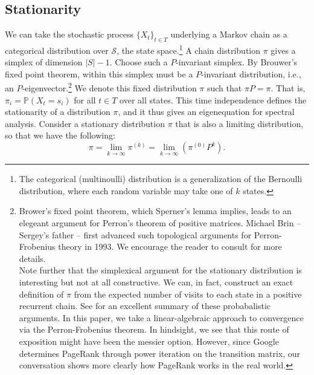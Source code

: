 \documentclass[11pt,letterpaper]{amsart}
\newcommand{\iterate}[2]{#1^{(#2)}}
\newcommand{\parens}[1]{ \left( #1 \right) }
\newcommand{\prob}{\mathbb{P}}
\begin{document}
\subsection{Stationarity}
We can take the stochastic process $\{X_t\}_{t \in T}$ underlying a Markov chain
as a categorical distribution over $\mathcal{S}$, the state space.\footnote{The
  categorical (multinoulli) distribution is a generalization of the Bernoulli
  distribution, where each random variable may take one of $k$ states.} A chain
distribution $\pi$ gives a simplex of dimension $|S| - 1$. Choose such a
$P$-invariant simplex. By Brouwer's fixed point theorem, within this simplex
must be a $P$-invariant distribution, i.e., an
$P$-eigenvector.\footnote{Brower's fixed point theorem, which Sperner's lemma
  implies, leads to an elegeant argument for Perron's theorem of positive
  matrices. Michael Brin -- Sergey's father -- first advanced such topological
  arguments for Perron-Frobenius theory in 1993. We encourage the reader to
  consult \cite{boyleBasicPerronFrobeniusTheory} for more details.
  \vspace{0.5em} \\ Note further that the simplexical argument for the
  stationary distribution is interesting but not at all constructive. We can, in
  fact, construct an exact definition of $\pi$ from the expected number of
  visits to each state in a positive recurrent chain. See
  \cite{freedmanConvergenceTheoremFinite} for an excellent summary of these
  probabalistic arguments. In this paper, we take a linear-algebraic approach to
  convergence via the Perron-Frobenius theorem. In hindsight, we see that this
  route of exposition might have been the messier option. However, since Google
  determines PageRank through power iteration on the transition matrix, our
  conversation shows more clearly how PageRank works in the real world.} We
denote this fixed distribution $\pi$ such that $\pi P = \pi$. That is,
$\pi_i = \prob(X_t = s_i)$ for all $t\in T$ over all states. This time
independence defines the stationarity of a distribution $\pi$, and it thus gives
an eigenequation for spectral analysis. Consider a stationary distribution $\pi$
that is also a limiting distribution, so that we have the following:
\begin{equation*}
  \pi = \lim_{k\to\infty}{{\iterate{\pi}{k}}} = \lim_{k\to\infty}{\parens{{\iterate{\pi}{0}} P^k}}.
\end{equation*}
\end{document}
